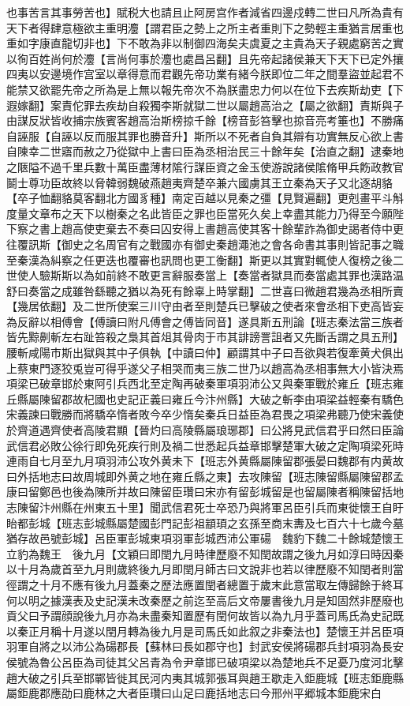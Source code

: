 也事苦言其事勞苦也】賦税大也請且止阿房宫作者減省四邊戍轉二世曰凡所為貴有天下者得肆意極欲主重明灋【謂君臣之勢上之所主者重則下之勢輕主重猶言居重也重如字康直龍切非也】下不敢為非以制御四海矣夫虞夏之主貴為天子親處窮苦之實以徇百姓尚何於灋【言尚何事於灋也處昌呂翻】且先帝起諸侯兼天下天下已定外攘四夷以安邊境作宫室以章得意而君觀先帝功業有緒今朕即位二年之間羣盜並起君不能禁又欲罷先帝之所為是上無以報先帝次不為朕盡忠力何以在位下去疾斯劫吏【下遐嫁翻】案責佗罪去疾劫自殺獨李斯就獄二世以屬趙高治之【屬之欲翻】責斯與子由謀反狀皆收捕宗族賓客趙高治斯榜掠千餘【榜音彭笞擊也掠音亮考箠也】不勝痛自誣服【自誣以反而服其罪也勝音升】斯所以不死者自負其辯有功實無反心欲上書自陳幸二世寤而赦之乃從獄中上書曰臣為丞相治民三十餘年矣【治直之翻】逮秦地之陿隘不過千里兵數十萬臣盡薄材隂行謀臣資之金玉使游說諸侯隂脩甲兵飭政教官鬬士尊功臣故終以脅韓弱魏破燕趙夷齊楚卒兼六國虜其王立秦為天子又北逐胡貉【卒子恤翻貉莫客翻北方國豸種】南定百越以見秦之彊【見賢遍翻】更剋畫平斗斛度量文章布之天下以樹秦之名此皆臣之罪也臣當死久矣上幸盡其能力乃得至今願陛下察之書上趙高使吏棄去不奏曰囚安得上書趙高使其客十餘輩詐為御史謁者侍中更往覆訊斯【御史之名周官有之戰國亦有御史秦趙澠池之會各命書其事則皆記事之職至秦漢為糾察之任更迭也覆審也訊問也更工衡翻】斯更以其實對輒使人復榜之後二世使人驗斯斯以為如前終不敢更言辭服奏當上【奏當者獄具而奏當處其罪也漢路温舒曰奏當之成雖咎繇聽之猶以為死有餘辜上時掌翻】二世喜曰微趙君幾為丞相所賣【幾居依翻】及二世所使案三川守由者至則楚兵已擊破之使者來會丞相下吏高皆妄為反辭以相傅會【傅讀曰附凡傅會之傅皆同音】遂具斯五刑論【班志秦法當三族者皆先黥劓斬左右趾笞殺之梟其首俎其骨肉于市其誹謗詈詛者又先斷舌謂之具五刑】腰斬咸陽市斯出獄與其中子俱執【中讀曰仲】顧謂其中子曰吾欲與若復牽黄犬俱出上蔡東門逐狡兎豈可得乎遂父子相哭而夷三族二世乃以趙高為丞相事無大小皆決焉　項梁已破章邯於東阿引兵西北至定陶再破秦軍項羽沛公又與秦軍戰於雍丘【班志雍丘縣屬陳留郡故杞國也史記正義曰雍丘今汴州縣】大破之斬李由項梁益輕秦有驕色宋義諫曰戰勝而將驕卒惰者敗今卒少惰矣秦兵日益臣為君畏之項梁弗聽乃使宋義使於齊道遇齊使者高陵君顯【晉灼曰高陵縣屬琅琊郡】曰公將見武信君乎曰然曰臣論武信君必敗公徐行即免死疾行則及禍二世悉起兵益章邯擊楚軍大破之定陶項梁死時連雨自七月至九月項羽沛公攻外黄未下【班志外黄縣屬陳留郡張晏曰魏郡有内黄故曰外括地志曰故周城即外黄之地在雍丘縣之東】去攻陳留【班志陳留縣屬陳留郡孟康曰留鄭邑也後為陳所并故曰陳留臣瓚曰宋亦有留彭城留是也留屬陳者稱陳留括地志陳留汴州縣在州東五十里】聞武信君死士卒恐乃與將軍呂臣引兵而東徙懷王自盱眙都彭城【班志彭城縣屬楚國彭門記彭祖顓頊之玄孫至商末夀及七百六十七歲今墓猶存故邑號彭城】呂臣軍彭城東項羽軍彭城西沛公軍碭　魏豹下魏二十餘城楚懷王立豹為魏王　後九月【文穎曰即閏九月時律歷廢不知閏故謂之後九月如淳曰時因秦以十月為歲首至九月則歲終後九月即閏月師古曰文說非也若以律歷廢不知閏者則當徑謂之十月不應有後九月蓋秦之歷法應置閏者總置于歲末此意當取左傳歸餘于終耳何以明之據漢表及史記漢未改秦歷之前迄至高后文帝屢書後九月是知固然非歷廢也貢父曰予謂顔說後九月亦為未盡秦知置歷有閏何故皆以為九月乎蓋司馬氏為史記既以秦正月稱十月遂以閏月轉為後九月是司馬氏如此叙之非秦法也】楚懷王并呂臣項羽軍自將之以沛公為碭郡長【蘇林曰長如郡守也】封武安侯將碭郡兵封項羽為長安侯號為魯公呂臣為司徒其父呂青為令尹章邯已破項梁以為楚地兵不足憂乃度河北擊趙大破之引兵至邯鄲皆徙其民河内夷其城郭張耳與趙王歇走入鉅鹿城【班志鉅鹿縣屬鉅鹿郡應劭曰鹿林之大者臣瓚曰山足曰鹿括地志曰今邢州平郷城本鉅鹿宋白